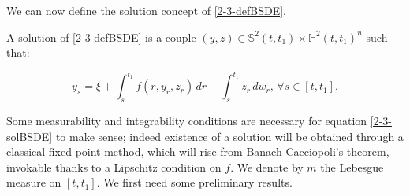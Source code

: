We can now define the solution concept of \eqref{2-3-defBSDE}.

\begin{definition}
    A solution of \eqref{2-3-defBSDE} is a couple $(y,z)\in\mathbb{S}^2(t,t_1)\times\mathbb{H}^2(t,t_1)^n$ such that:
    
    \begin{equation}\label{2-3-solBSDE}
        y_s = \xi + \int_s^{t_1} f(r,y_r,z_r)\,dr - \int_s^{t_1} z_r\,dw_r,\,\forall s\in[t,t_1].
    \end{equation}  
\end{definition}

Some measurability and integrability conditions are necessary for equation \eqref{2-3-solBSDE} to make sense; indeed existence 
of a solution will be obtained through a classical fixed point method, which will rise from Banach-Cacciopoli's theorem, invokable thanks to a Lipschitz condition on $f$. 
We denote by $m$ the Lebesgue measure on $[t,t_1]$. We first need some preliminary results.

